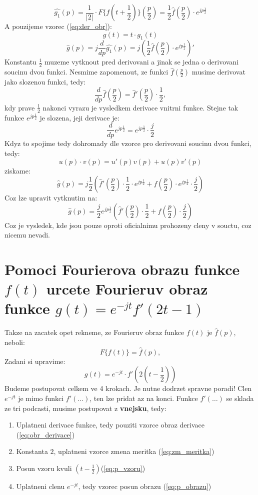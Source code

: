 $$\hat{g_1}(p) = \frac{1}{|2|} \cdot F\{ f\left(t+\frac{1}{2}\right) \} \left( \frac{p}{2}\right) = \frac{1}{2} \hat{f}\left( \frac{p}{2}\right)\cdot e^{jp\frac{1}{2}}$$
A pouzijeme vzorec (\ref{eq:der_obr}):
$$g(t) = t\cdot g_1(t)$$
$$\hat{g}(p) = j\frac{d}{dp}\hat{g_1}(p) = j \left( \frac{1}{2} \hat{f}\left( \frac{p}{2}\right)\cdot e^{jp\frac{1}{2}}\right)'$$
Konstantu $\frac{1}{2}$ muzeme vytknout pred derivovani a jinak se jedna o derivovani soucinu dvou funkci. Nesmime zapomenout, ze funkci $\hat{f}\left( \frac{p}{2} \right)$ musime derivovat jako slozenou funkci, tedy:
$$\frac{d}{dp}\hat{f}\left( \frac{p}{2} \right) = \hat{f}'\left(\frac{p}{2}\right) \cdot \frac{1}{2},$$
kdy prave $\frac{1}{2}$ nakonci vyrazu je vysledkem derivace vnitrni funkce.
Stejne tak funkce $e^{jp\frac{1}{2}}$ je slozena, jeji derivace je:
$$\frac{d}{dp}e^{jp\frac{1}{2}} = e^{jp\frac{1}{2}} \cdot \frac{j}{2}$$
Kdyz to spojime tedy dohromady dle vzorce pro derivovani soucinu dvou funkci, tedy:
$$u(p)\cdot v(p) = u'(p)v(p)+u(p)v'(p)$$
ziskame:
$$\hat{g}(p)=j\frac{1}{2} \left( \hat{f}'\left(\frac{p}{2} \right) \cdot \frac{1}{2} \cdot e^{jp\frac{1}{2}} + \hat{f}\left( \frac{p}{2} \right) \cdot e^{jp\frac{1}{2}} \cdot \frac{j}{2} \right)$$
Coz lze upravit vytknutim na:
$$\hat{g}(p)=\frac{j}{2} e^{jp\frac{1}{2}} \left( \hat{f}'\left(\frac{p}{2} \right) \cdot \frac{1}{2} + \hat{f}\left( \frac{p}{2} \right) \cdot \frac{j}{2} \right)$$
Coz je vysledek, kde jsou pouze oproti oficialnimu prohozeny cleny v souctu, coz nicemu nevadi. 

\newpage
\section{Pomoci Fourierova obrazu funkce $f(t)$ urcete Fourieruv obraz funkce $g(t)=e^{-jt}f'(2t-1)$}

Takze na zacatek opet rekneme, ze Fourieruv obraz funkce $f(t)$ je $\hat{f}(p)$, neboli:
$$F\{ f(t) \} = \hat{f}(p),$$
Zadani si upravime:
$$g(t)=e^{-jt}\cdot f'(2\left(t-\frac{1}{2}\right))$$
Budeme postupovat celkem ve 4 krokach. Je nutne dodrzet spravne poradi! Clen $e^{-jt}$ je mimo funkci $f'(\dots )$, ten lze pridat az na konci. Funkce $f'(\dots)$ se sklada ze tri podcasti, musime postupovat z \textbf{vnejsku}, tedy:
\begin{enumerate}
\item Uplatneni derivace funkce, tedy pouziti vzorce obraz derivace (\ref{eq:obr_derivace})
\item Konstanta $2$, uplatneni vzorce zmena meritka (\ref{eq:zm_meritka})
\item Posun vzoru kvuli $\left(t-\frac{1}{2}\right)$(\ref{eq:p_vzoru})
\item Uplatneni clenu $e^{-jt}$, tedy vzorec posun obrazu (\ref{eq:p_obrazu})
\end{enumerate}


